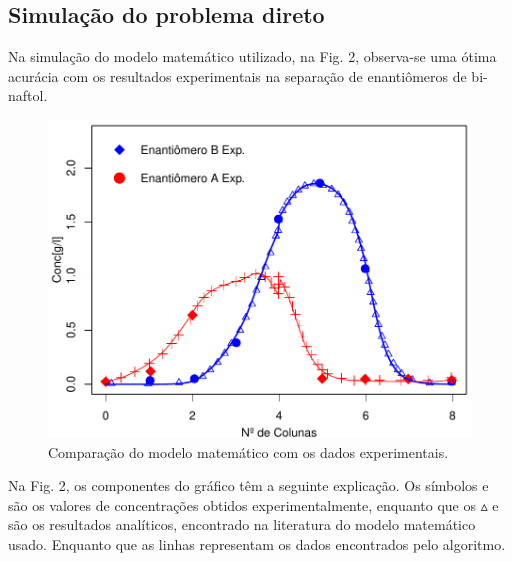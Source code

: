\documentclass[por]{Template_SBEF}
\begin{document}
\subsection{Simulação do problema direto}
Na simulação do modelo matemático utilizado, na Fig. 2, observa-se uma ótima acurácia com os resultados experimentais na separação de enantiômeros de bi-naftol.
\begin{figure}[H] 
	\centering
	\includegraphics[width=.8\columnwidth]{Arquivos/problema.pdf} 
	\caption{Comparação do modelo matemático com os dados experimentais.} 
\end{figure}

Na Fig. 2, os componentes do gráfico têm a seguinte explicação. Os símbolos  e  são os valores de concentrações obtidos experimentalmente, enquanto que os $\vartriangle$ e  são os resultados analíticos, encontrado na literatura\cite{pais} do modelo matemático usado. Enquanto que as linhas representam os dados encontrados pelo algoritmo.
\end{document}
